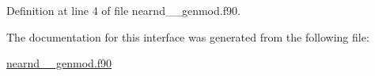 Definition at line 4 of file nearnd\+\_\+\+\_\+genmod.\+f90.



The documentation for this interface was generated from the following file\+:\begin{DoxyCompactItemize}
\item 
\hyperlink{nearnd____genmod_8f90}{nearnd\+\_\+\+\_\+genmod.\+f90}\end{DoxyCompactItemize}
